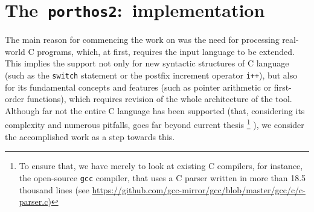 \chapter{The~\texttt{porthos2}:~implementation}
\label{ch:impl}

The main reason for commencing the work on \porthos[2] was the need for processing real-world C programs, which, at first, requires the input language to be extended.
This implies the support not only for new syntactic structures of C language (such as the \texttt{switch} statement or the postfix increment operator \texttt{i++}), but also for its fundamental concepts and features (such as pointer arithmetic or first-order functions), which requires revision of the whole architecture of the tool.
Although far not the entire C language has been supported (that, considering its complexity and numerous pitfalls, goes far beyond current thesis%
\footnote{To ensure that, we have merely to look at existing C compilers, for instance, the open-source \texttt{gcc} compiler, that uses a C parser written in more than 18.5 thousand lines (see \url{https://github.com/gcc-mirror/gcc/blob/master/gcc/c/c-parser.c})}%
), we consider the accomplished work as a step towards this.





